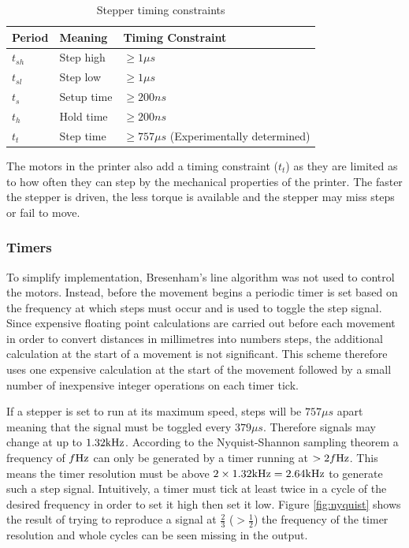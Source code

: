 				
				\begin{table}
					\centering
					\begin{tabular}{l l l}
						\toprule
						Period & Meaning & Timing Constraint\\
						\midrule
						$t_{sh}$ & Step high  & $\ge 1\mu{}s$ \cite{allegro} \\
						$t_{sl}$ & Step low   & $\ge 1\mu{}s$ \cite{allegro} \\
						\addlinespace
						$t_{s}$  & Setup time & $\ge 200ns$   \cite{allegro} \\
						$t_{h}$  & Hold time  & $\ge 200ns$   \cite{allegro} \\
						\addlinespace
						$t_{t}$  & Step time  & $\ge 757\mu{}s$ (Experimentally determined) \\
						\bottomrule
					\end{tabular}
					
					\caption{Stepper timing constraints}
					\label{tab:stepperTiming}
				\end{table}
				
				The motors in the printer also add a timing constraint ($t_t$) as they
				are limited as to how often they can step by the mechanical properties
				of the printer. The faster the stepper is driven, the less torque is
				available and the stepper may miss steps or fail to move.
			
			\subsubsection{Timers}
				
				To simplify implementation, Bresenham's line algorithm \cite{bresenham}
				was not used to control the motors. Instead, before the movement begins
				a periodic timer is set based on the frequency at which steps must occur
				and is used to toggle the step signal. Since expensive floating point
				calculations are carried out before each movement in order to convert
				distances in millimetres into numbers steps, the additional calculation
				at the start of a movement is not significant. This scheme therefore
				uses one expensive calculation at the start of the movement followed by
				a small number of inexpensive integer operations on each timer tick.
				
				If a stepper is set to run at its maximum speed, steps will be
				$757\mu{}s$ apart meaning that the signal must be toggled every
				$379\mu{}s$.  Therefore signals may change at up to $1.32\textrm{kHz}$.
				According to the Nyquist-Shannon sampling theorem a frequency of $f\textrm{Hz}$
				can only be generated by a timer running at $> 2f\textrm{Hz}$. This means the
				timer resolution must be above $2 \times 1.32\textrm{kHz} = 2.64\textrm{kHz}$ to
				generate such a step signal\cite{shannon}. Intuitively, a timer must
				tick at least twice in a cycle of the desired frequency in order to set
				it high then set it low. Figure \ref{fig:nyquist} shows the result of
				trying to reproduce a signal at $\frac{2}{3}$ ($> \frac{1}{2}$) the
				frequency of the timer resolution and whole cycles can be seen missing
				in the output.
				
